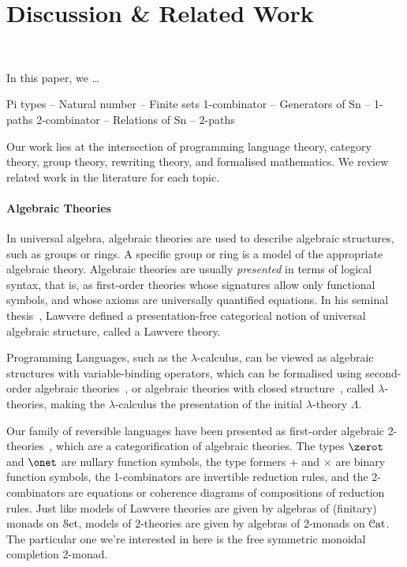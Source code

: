 \section{Discussion \& Related Work}~\label{sec:discussion}

In this paper, we \ldots


Pi types -- Natural number -- Finite sets
1-combinator -- Generators of Sn -- 1-paths
2-combinator -- Relations of Sn -- 2-paths



Our work lies at the intersection of programming language theory, category theory, group theory, rewriting theory, and
formalised mathematics. We review related work in the literature for each topic.

\paragraph{Algebraic Theories} In universal algebra, algebraic theories are used to describe algebraic structures, such
as groups or rings. A specific group or ring is a model of the appropriate algebraic theory. Algebraic theories are
usually \emph{presented} in terms of logical syntax, that is, as first-order theories whose signatures allow only
functional symbols, and whose axioms are universally quantified equations. In his seminal
thesis~\cite{lawvereFUNCTORIALSEMANTICSALGEBRAIC1963}, Lawvere defined a presentation-free categorical notion of
universal algebraic structure, called a Lawvere theory.

Programming Languages, such as the $\lambda$-calculus, can be viewed as algebraic structures with variable-binding
operators, which can be formalised using second-order algebraic theories~\cite{fioreSecondOrderAlgebraicTheories2010},
or algebraic theories with closed structure~\cite{hylandClassicalLambdaCalculus2017}, called $\lambda$-theories, making
the $\lambda$-calculus the presentation of the initial $\lambda$-theory $\Lambda$.

Our family of reversible languages have been presented as first-order algebraic
2-theories~\cite{cohenCoherenceRewriting2theories2009,bekeCategorificationTermRewriting2011,yanofskySyntaxCoherence2000},
which are a categorification of algebraic theories. The types $\zerot$ and $\onet$ are nullary function symbols, the
type formers $+$ and $\times$ are binary function symbols, the 1-combinators are invertible reduction rules, and the
2-combinators are equations or coherence diagrams of compositions of reduction rules. Just like models of Lawvere
theories are given by algebras of (finitary) monads on $\SetCat$, models of 2-theories are given by algebras of 2-monads
on $\CatCat$. The particular one we're interested in here is the free symmetric monoidal completion 2-monad.


